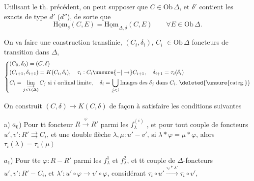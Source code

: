 

Utilisant le th. précédent, on peut supposer que $C\in\mathrm{Ob}\,\Delta$, et $\delta'$  contient les  exacts de type $d'$ ($d''$), de sorte que
\[
\underline{\mathrm{Hom}}_\delta(C,E)=\underline{\mathrm{Hom}}_{\Delta,\delta}(C,E)\qquad\forall E\in\mathrm{Ob}\,\Delta.
\]

On va faire une construction transfinie, $(C_i,\delta_i)$, $C_i$  $\in\mathrm{Ob}\,\Delta$ foncteurs de transition dans $\Delta$,
\[
\left\{\begin{aligned}
&(C_0,\delta_0)=(C,\delta)\\
&(C_{i+1},\delta_{i+1})=K(C_i,\delta_i),\quad\tau_i:C_i\unsure{-|\to}C_{i+1},\quad\delta_{i+1}=\tau_i(\delta_i)\\
&C_i=\varinjlim_{j<i\,(\Delta)}C_j\text{ si }i\text{ ordinal limite},\quad\delta_i=\bigcup_{\underline j<i}\text{Images des }\delta_j\text{ dans }C_i.\ \deleted{\unsure{\text{categ.}}}
\end{aligned}\right.
\]

On construit $(C,\delta)\longmapsto K(C,\delta)$ de façon à satisfaire les conditions suivantes

a) \quad $a_0$) Pour tt foncteur $R\xrightarrow{\varphi}R'$ parmi les $f^{(i)}_\lambda$ , et pour tout couple de \inserted{$\Delta$-}foncteurs $u',v':R'\rightrightarrows C_i$, et une double flèche $\lambda,\mu:u'-v'$, si $\lambda*\varphi=\mu*\varphi$, alors $\tau_i(\lambda)=\tau_i(\mu)$

$a_1$) Pour tte  $\varphi:R-R'$ parmi les $f^1_\lambda$ et $f^2_\lambda$, et tt couple de $\Delta$-foncteurs $u',v':R'-C_i$, et $\lambda':u'\circ\varphi\to v'\circ\varphi$,  considérant $\tau_i\circ u'\xrightarrow{\tau_i*\lambda'}\tau_i\circ v'$,



